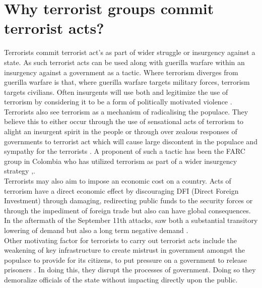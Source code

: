 \section{Why terrorist groups commit terrorist acts?}
Terrorists commit terrorist act's as part of wider struggle or insurgency against a state. As such terrorist acts can be used along with guerilla warfare within an insurgency against a government as a tactic. Where terrorism diverges from guerilla warfare is that, where guerilla warfare targets military forces, terrorism targets civilians. Often insurgents will use both and legitimize the use of terrorism by considering it to be a form of politically motivated violence \citep{ganor2002defining}. Terrorists also see terrorism as a mechanism of radicalising the populace. They believe this to either occur through the use of sensational acts of terrorism to alight an insurgent spirit in the people or through over zealous  responses of governments to terrorist act which will cause large discontent in the populace and sympathy for the terrorists \citep{jenkins1985international}. A proponent of such a tactic has been the FARC group in Colombia who has utilized terrorism as part of a wider insurgency strategy   \citep{wickham1990terror},\citep{marks2002colombian}.
\\
Terrorists may also aim to impose an economic cost on a country. Acts of terrorism have a direct economic  effect by discouraging DFI (Direct Foreign Investment) through damaging, redirecting public funds to the security forces or through the impediment of foreign trade \citep{sandler2008economic} but also can have global consequences. In the aftermath of the September 11th attacks, saw both a substantial transitory lowering of demand but also a long term negative demand \citep{ito2005assessing}.
\\
Other motivating factor for terrorists to carry out terrorist acts include the weakening of key infrastructure to create mistrust in government amongst the populace to provide for its citizens, to put pressure on a government to release prisoners  \citep{TerrorismTypes2016}. In doing this, they disrupt the processes of government. Doing so they demoralize officials of the state without impacting directly upon the public. 

